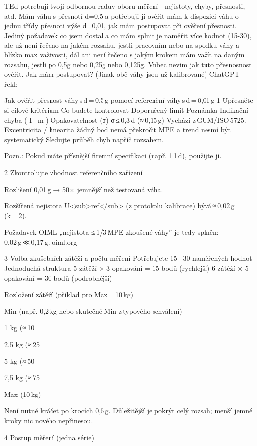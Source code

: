 TEd potrebuji tvoji odbornou raduv oboru měření - nejistoty, chyby, přesnosti, atd. Mám váhu s přesnotí d=0,5 a potřebuji ji ověřit mám k dispozici váhu o jednu třídy přesnoti výše d=0,01, jak mám postupovat při ověření přesnosti. Jediný požadavek co jsem dostal a co mám splnit je naměřit více hodnot (15-30), ale už není řečeno na jakém rozsahu, jestli pracovním nebo na spodku váhy a blízko max važivosti, dál ani není řečeno s jakým krokem mám važít na daným rozsahu, jestli po 0,5g nebo 0,25g nebo 0,125g. Vubec nevim jak tuto přesnosnost ověřit. Jak mám postupovat? (Jinak obě váhy jsou už kalibrované)
ChatGPT řekl:

Jak ověřit přesnost váhy s d = 0,5 g pomocí referenční váhy s d = 0,01 g
1  Upřesněte si cílové kritérium
Co budete kontrolovat	Doporučený limit	Poznámka
Indikační chyba (	I – m	)
Opakovatelnost (σ)	σ ≤ 0,3 d (≈ 0,15 g)	Vychází z GUM/ISO 5725.
Excentricita / linearita	žádný bod nemá překročit MPE a trend nesmí být systematický	Sledujte průběh chyb napříč rozsahem.

    Pozn.: Pokud máte přísnější firemní specifikaci (např. ±1 d), použijte ji.

2  Zkontrolujte vhodnost referenčního zařízení

    Rozlišení 0,01 g → 50× jemnější než testovaná váha.

    Rozšířená nejistota U<sub>ref</sub> (z protokolu kalibrace) bývá ≈ 0,02 g (k = 2).

    Požadavek OIML „nejistota ≤ 1/3 MPE zkoušené váhy” je tedy splněn: 0,02 g ≪ 0,17 g.
    oiml.org

3  Volba zkušebních zátěží a počtu měření
Potřebujete 15 – 30 naměřených hodnot	Jednoduchá struktura
5 zátěží × 3 opakování = 15 bodů	(rychlejší)
6 zátěží × 5 opakování = 30 bodů	(podrobnější)

Rozložení zátěží (příklad pro Max = 10 kg)

    Min (např. 0,2 kg nebo skutečné Min z typového schválení)

    1 kg (≈ 10 %

    2,5 kg (≈ 25 %

    5 kg (≈ 50 %

    7,5 kg (≈ 75 %

    Max (10 kg)

    Není nutné kráčet po krocích 0,5 g. Důležitější je pokrýt celý rozsah; menší jemné kroky nic nového nepřinesou.

4  Postup měření (jedna série)

